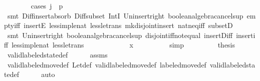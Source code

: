 \begin{isabellebody}
\ \ \ \ \ \ \isamarkupfalse%
\ {\isacharparenleft}cases\ {\isachardoublequoteopen}j\ {\isacharequal}\ p{}{\isachardoublequoteclose}{\isacharparenright}\isanewline
\ \ \ \ \ \ \isamarkupfalse%
\ {\isacharparenleft}smt\ Diff{\isacharunderscore}insert{\isacharunderscore}absorb\ Diff{\isacharunderscore}subset\ IntI\ Un{\isacharunderscore}insert{\isacharunderscore}right\ boolean{\isacharunderscore}algebra{\isacharunderscore}cancel{\isachardot}sup{}\ empty{\isacharunderscore}iff\ insertE\ less{\isacharunderscore}imp{\isacharunderscore}le{\isacharunderscore}nat\ less{\isacharunderscore}le{\isacharunderscore}trans\ mk{\isacharunderscore}disjoint{\isacharunderscore}insert\ nat{\isacharunderscore}neq{\isacharunderscore}iff\ subsetD{\isacharparenright}\isanewline
\ \ \ \ \ \ \isamarkupfalse%
\ {\isacharparenleft}smt\ Un{\isacharunderscore}insert{\isacharunderscore}right\ boolean{\isacharunderscore}algebra{\isacharunderscore}cancel{\isachardot}sup{}\ disjoint{\isacharunderscore}iff{\isacharunderscore}not{\isacharunderscore}equal\ insert{\isacharunderscore}Diff\ insert{\isacharunderscore}iff\ less{\isacharunderscore}imp{\isacharunderscore}le{\isacharunderscore}nat\ less{\isacharunderscore}le{\isacharunderscore}trans{\isacharparenright}\isanewline
\ \ \ \ \ \ \isamarkupfalse%
\isanewline
\ \ \ \ \isamarkupfalse%
\ {\isachardoublequoteopen}x\ {\isasymin}\ {\isacharbraceleft}{\isacharbraceright}{\isachardoublequoteclose}\isanewline
\ \ \ \ \ \ \isamarkupfalse%
\ simp\isanewline
\ \ \isamarkupfalse%
\isanewline
\isanewline
\ \ \isamarkupfalse%
\isanewline
\isanewline
\ \ \isamarkupfalse%
\ {\isacharquery}thesis\isanewline
\ \ \ \ \isamarkupfalse%
\ valid{\isacharunderscore}labeled{\isacharunderscore}state{\isacharunderscore}def\isanewline
\ \ \ \ \isamarkupfalse%
\ assms\isanewline
\ \ \ \ \isamarkupfalse%
\ valid{\isacharunderscore}labeled{\isacharunderscore}move{\isacharunderscore}def\ Let{\isacharunderscore}def\ valid{\isacharunderscore}labeled{\isacharunderscore}move{\isacharprime}{\isacharunderscore}def\ labeled{\isacharunderscore}move{\isacharunderscore}def\ valid{\isacharunderscore}labeled{\isacharunderscore}state{\isacharunderscore}def\isanewline
\ \ \ \ \isamarkupfalse%
\ auto\isanewline
{}\isamarkupfalse%
%
\endisatagproof
{\isafoldproof}%
%
\isadelimproof
\isanewline
%
\endisadelimproof

\end{isabellebody}
